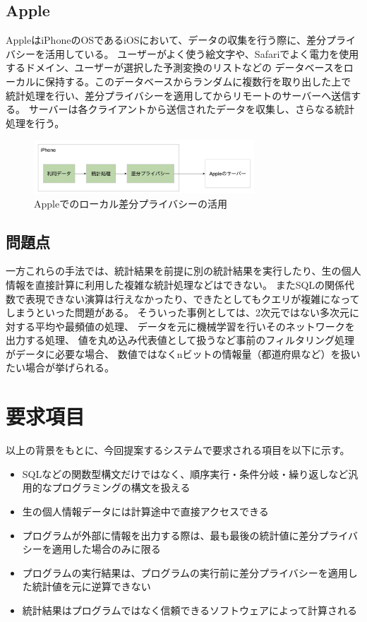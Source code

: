 \documentclass[a4paper,11pt]{jreport}
\begin{document}
\subsection{Apple}

AppleはiPhoneのOSであるiOSにおいて、データの収集を行う際に、差分プライバシーを活用している。\cite{apple}
ユーザーがよく使う絵文字や、Safariでよく電力を使用するドメイン、ユーザーが選択した予測変換のリストなどの
データベースをローカルに保持する。このデータベースからランダムに複数行を取り出した上で
統計処理を行い、差分プライバシーを適用してからリモートのサーバーへ送信する。
サーバーは各クライアントから送信されたデータを収集し、さらなる統計処理を行う。

\begin{figure}[htbp]
    \centering
\includegraphics[height=20mm]{apple.png}
    \caption{Appleでのローカル差分プライバシーの活用}
    \label{fig:apple}
\end{figure}

\subsection{問題点}

一方これらの手法では、統計結果を前提に別の統計結果を実行したり、生の個人情報を直接計算に利用した複雑な統計処理などはできない。
またSQLの関係代数で表現できない演算は行えなかったり、できたとしてもクエリが複雑になってしまうといった問題がある。
そういった事例としては、2次元ではない多次元に対する平均や最頻値の処理、
データを元に機械学習を行いそのネットワークを出力する処理、
値を丸め込み代表値として扱うなど事前のフィルタリング処理がデータに必要な場合、
数値ではなくnビットの情報量（都道府県など）を扱いたい場合が挙げられる。

\section{要求項目}

以上の背景をもとに、今回提案するシステムで要求される項目を以下に示す。
\begin{itemize}
    \item SQLなどの関数型構文だけではなく、順序実行・条件分岐・繰り返しなど汎用的なプログラミングの構文を扱える
    \item 生の個人情報データには計算途中で直接アクセスできる
    \item プログラムが外部に情報を出力する際は、最も最後の統計値に差分プライバシーを適用した場合のみに限る
    \item プログラムの実行結果は、プログラムの実行前に差分プライバシーを適用した統計値を元に逆算できない
    \item 統計結果はプログラムではなく信頼できるソフトウェアによって計算される
\end{itemize}
\end{document}

